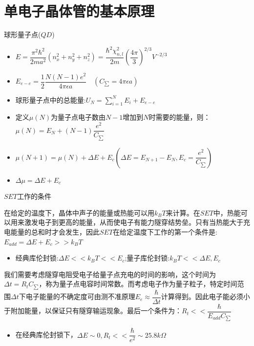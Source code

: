 \documentclass{beamer}[fontset=windows]
\begin{document}
    \section{单电子晶体管的基本原理}
    \begin{frame}
    \begin{block}{球形量子点($QD$)}
    \begin{itemize}
    \item $E=\dfrac{\pi^{2}\hbar^{2}}{2ma^{2}}(n_{x}^{2}+n_{y}^{2}+n_{z}^{2})=\dfrac{\hbar^{2}\chi_{n,l}^{2}}{2m}(\dfrac{4\pi}{3})^{2/3}V^{-2/3}$
    \item $E_{e-e}=\dfrac{1}{2}\dfrac{N(N-1)e^{2}}{4\pi \epsilon a}\quad(C_{\sum}=4\pi\epsilon a)$
    \item 球形量子点中的总能量:$U_{N}=\sum\limits_{i=1}^{N}E_{i}+E_{e-e}$
    \item 定义$\mu(N)$为量子点电子数由$N-1$增加到$N$时需要的能量，则：$\mu(N)=E_{N}+(N-1)\dfrac{e^{2}}{C_{\sum}}$
    \item $\mu(N+1)=\mu(N)+\Delta E+E_{c}(\Delta E=E_{N+1}-E_{N},E_{c}=\dfrac{e^{2}}{C_{\sum}})$
    \item $\Delta \mu=\Delta E+E_{c}$
    \end{itemize}
    \end{block}
    \end{frame}
    \begin{frame}
    \begin{block}{$SET$工作的条件}
    \begin{itemize}\small{
    \item 在给定的温度下，晶体中声子的能量或热能可以用$k_{B}T$来计算。在$SET$中，热能可以用来激发电子到更高的能量，从而使电子有能力隧穿结势垒。只有当热能大于充电能量的总和时才会发生，因此$SET$在给定温度下工作的第一个条件是:$E_{add}=\Delta E+E_{c}>>k_{B}T$
    \begin{itemize}
    \item 经典库伦封锁:$\Delta E<<k_{B}T<<E_{c}$;量子库伦封锁:$k_{B}T<<\Delta E,E_{c}$
    \end{itemize}
    \item 我们需要考虑隧穿电阻受电子给量子点充电的时间的影响，这个时间为$\Delta t=R_{t}C_{\sum}$，称为量子点电容时间常数。而考虑电子作为量子粒子，特定时间范围$\Delta t$下电子能量的不确定度可由测不准原理$E_{e}\approx\dfrac{\hbar}{\Delta t}$计算得到。因此电子能必须小于附加能量，以保证只有隧穿输运现象。最后一个条件为：$R_{t}<<\dfrac{\hbar}{E_{add}C_{\sum}}$
    \begin{itemize}
    \item 在经典库伦封锁下，$\Delta E\sim 0,R_{t}<<\dfrac{\hbar}{e^{2}}\sim 25.8k\Omega$
    \end{itemize}}
    \end{itemize}
    \end{block}
    \end{frame}
\end{document}
